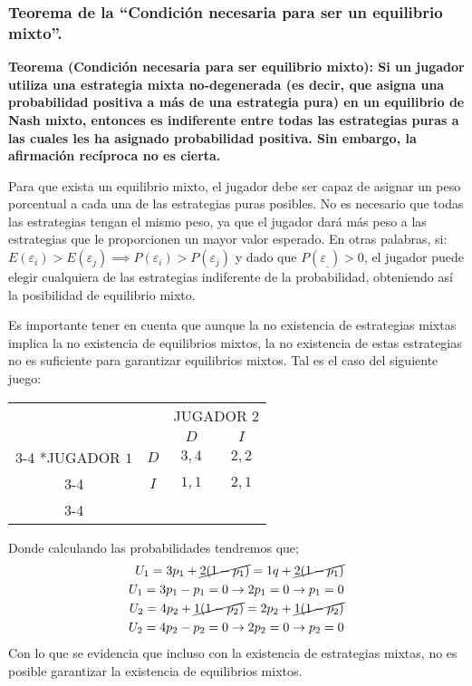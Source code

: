 \documentclass[12pt]{article}
\begin{document}
\subsubsection{Teorema de la “Condición necesaria para ser un equilibrio mixto”.}
\begin{flushleft}
    \textbf{Teorema (Condición necesaria para ser equilibrio mixto): Si un jugador utiliza una estrategia mixta no-degenerada (es decir, que asigna una probabilidad positiva a más de una estrategia pura) en un equilibrio de Nash mixto, entonces es indiferente entre todas las estrategias puras a las cuales les ha asignado probabilidad positiva. Sin embargo, la afirmación recíproca no es cierta.}
\end{flushleft}
\begin{flushleft}
    Para que exista un equilibrio mixto, el jugador debe ser capaz de asignar un peso porcentual a cada una de las estrategias puras posibles. No es necesario que todas las estrategias tengan el mismo peso, ya que el jugador dará más peso a las estrategias que le proporcionen un mayor valor esperado. En otras palabras, si:
    $E(\varepsilon_i)>E(\varepsilon_j) \implies P(\varepsilon_i) > P(\varepsilon_j)$ y dado que
    $P(\varepsilon_\_) > 0$, el jugador puede elegir cualquiera de las estrategias indiferente de la probabilidad, obteniendo así la posibilidad de equilibrio mixto.

    Es importante tener en cuenta que aunque la no existencia de estrategias mixtas implica la no existencia de equilibrios mixtos, la no existencia de estas estrategias no es suficiente para garantizar equilibrios mixtos. Tal es el caso del siguiente juego:
    \begin{center}    
        \setlength{\extrarowheight}{0pt}
        \begin{tabular}{cc|c|c|}
            & \multicolumn{1}{c}{} & \multicolumn{2}{c}{JUGADOR $2$}\\
            & \multicolumn{1}{c}{} & \multicolumn{1}{c}{$D$}  & \multicolumn{1}{c}{$I$} \\\cline{3-4}
            \multirow{2}*{JUGADOR $1$}  & $D$ & $3,4$ & $2,2$ \\\cline{3-4}
            & $I$ & $1,1$ & $2,1$ \\\cline{3-4}
        \end{tabular}
    \end{center}
    Donde calculando las probabilidades tendremos que;
    \begin{align*}
        U_1 = 3p_1+\cancel{2(1-p_1)}=1q+\cancel{2(1-p_1)}\\
        U_1 = 3p_1-p_1=0 \to 2p_1=0\to p_1=0\\
        U_2 = 4p_2+\cancel{1(1-p_2)}=2p_2+\cancel{1(1-p_2)}\\
        U_2 = 4p_2-p_2=0 \to 2p_2=0\to p_2=0\\
    \end{align*}
    Con lo que se evidencia que incluso con la existencia de estrategias mixtas, no es posible garantizar la existencia de equilibrios mixtos.
\end{flushleft}
\end{document}
